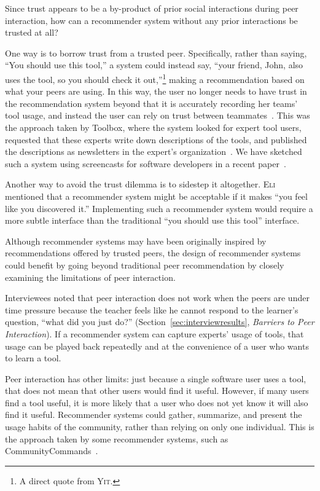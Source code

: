 \documentclass[smallextended]{svjour3}
\newcommand\discovery{peer interaction\xspace}
\newcommand\Discovery{Peer interaction\xspace}
\newcommand\DisCovery{Peer Interaction\xspace}
\newcommand\discpush{peer recommendation\xspace}
\newcommand{\subject}[1]{\textsc{#1}}
\newcommand{\csub}{{\subject{Eli}}\xspace}
\newcommand{\jsub}{{\subject{Yit}}\xspace}
\begin{document}
Since trust appears to be a by-product of prior social interactions during \discovery,
how can a recommender system without any prior interactions be trusted
at all?

One way is to borrow trust from a trusted peer. 
Specifically, rather than saying, ``You should use this tool,'' a
system could instead say, ``your friend, John, also uses the
tool, so you should check it out,''\footnote{A direct quote from \jsub.} making
a recommendation based on what your peers are using.
In this way, the user no longer needs to have trust in the recommendation
system beyond that it is accurately recording her teams' tool usage, and
instead the user can rely on trust between teammates~\cite{murphyHill12b}.
This was the approach taken by Toolbox, where the system
looked for expert tool users, requested that these experts write down
descriptions of the tools, and published the descriptions as newsletters in
the expert's organization~\cite{maltzahn}.
We have sketched such a system using screencasts 
for software developers in a recent paper~\cite{murphyHill12b}.

Another way to avoid the trust dilemma is to sidestep it altogether.
\csub mentioned that a recommender system might be acceptable if it makes ``you
feel like you discovered it.''
Implementing such a recommender system would require a more subtle interface
than the traditional ``you should use this tool'' interface.

\paraHead{Beyond \DisCovery.}
Although recommender systems may have been originally inspired by
recommendations offered by trusted peers, the design of recommender systems
could benefit by going beyond traditional \discpush by closely
examining the limitations of \discovery.

Interviewees noted that \discovery does not work when the peers are under time
pressure because the teacher feels like he cannot respond to the learner's
question, ``what did you just do?'' (Section~\ref{sec:interviewresults}, \textit{Barriers to Peer Interaction}).
If a recommender system can capture experts' usage of tools, that
usage can be played back repeatedly and at the convenience of a user who
wants to learn a tool.

\Discovery has other limits: just because a single software user uses a tool,
that does not mean that other users would find it useful.
However, if many users find a tool useful, it is more likely that a
user who does not yet know it will also find it useful.
Recommender systems could gather, summarize, and present the usage habits of
the community, rather than relying on only one individual.
This is the approach taken by some recommender systems, such as
CommunityCommands~\cite{matejka09}.
\end{document}
